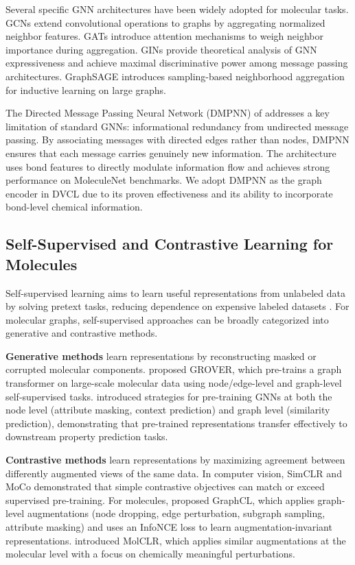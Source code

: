 \documentclass[a4paper,fleqn]{cas-sc}
\begin{document}
Several specific GNN architectures have been widely adopted for molecular tasks. GCNs \citep{kipf2017semi} extend convolutional operations to graphs by aggregating normalized neighbor features. GATs \citep{velickovic2018graph} introduce attention mechanisms to weigh neighbor importance during aggregation. GINs \citep{xu2018powerful} provide theoretical analysis of GNN expressiveness and achieve maximal discriminative power among message passing architectures. GraphSAGE \citep{hamilton2017inductive} introduces sampling-based neighborhood aggregation for inductive learning on large graphs.

The Directed Message Passing Neural Network (DMPNN) of \citet{yang2019analyzing} addresses a key limitation of standard GNNs: informational redundancy from undirected message passing. By associating messages with directed edges rather than nodes, DMPNN ensures that each message carries genuinely new information. The architecture uses bond features to directly modulate information flow and achieves strong performance on MoleculeNet benchmarks. We adopt DMPNN as the graph encoder in DVCL due to its proven effectiveness and its ability to incorporate bond-level chemical information.

\subsection{Self-Supervised and Contrastive Learning for Molecules}

Self-supervised learning aims to learn useful representations from unlabeled data by solving pretext tasks, reducing dependence on expensive labeled datasets \citep{liu2022pre}. For molecular graphs, self-supervised approaches can be broadly categorized into generative and contrastive methods.

\textbf{Generative methods} learn representations by reconstructing masked or corrupted molecular components. \citet{rong2020self} proposed GROVER, which pre-trains a graph transformer on large-scale molecular data using node/edge-level and graph-level self-supervised tasks. \citet{hu2020strategies} introduced strategies for pre-training GNNs at both the node level (attribute masking, context prediction) and graph level (similarity prediction), demonstrating that pre-trained representations transfer effectively to downstream property prediction tasks.

\textbf{Contrastive methods} learn representations by maximizing agreement between differently augmented views of the same data. In computer vision, SimCLR \citep{chen2020simple} and MoCo \citep{he2020momentum} demonstrated that simple contrastive objectives can match or exceed supervised pre-training. For molecules, \citet{you2020graph} proposed GraphCL, which applies graph-level augmentations (node dropping, edge perturbation, subgraph sampling, attribute masking) and uses an InfoNCE loss to learn augmentation-invariant representations. \citet{wang2022molclr} introduced MolCLR, which applies similar augmentations at the molecular level with a focus on chemically meaningful perturbations.
\end{document}
